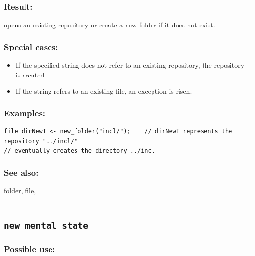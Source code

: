 \documentclass[]{book}
\providecommand{\tightlist}{%
  \setlength{\itemsep}{0pt}\setlength{\parskip}{0pt}}
\theoremstyle{definition}
\theoremstyle{definition}
\theoremstyle{definition}
\theoremstyle{remark}
\begin{document}
\subsubsection{Result:}\label{result-357}

opens an existing repository or create a new folder if it does not
exist.

\subsubsection{Special cases:}\label{special-cases-104}

\begin{itemize}
\tightlist
\item
  If the specified string does not refer to an existing repository, the
  repository is created.\\
\item
  If the string refers to an existing file, an exception is risen.
\end{itemize}

\subsubsection{Examples:}\label{examples-256}

\begin{verbatim}
file dirNewT <- new_folder("incl/");    // dirNewT represents the repository "../incl/"                                                             // eventually creates the directory ../incl 
\end{verbatim}

\subsubsection{See also:}\label{see-also-148}

\href{operators-d-to-h.html\#folder}{folder},
\href{operators-d-to-h.html\#file}{file},

\begin{center}\rule{0.5\linewidth}{\linethickness}\end{center}

\subsection{\texorpdfstring{\texttt{new\_mental\_state}}{new\_mental\_state}}\label{new_mental_state}

\subsubsection{Possible use:}\label{possible-use-370}
\end{document}
